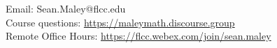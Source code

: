 \documentclass[11pt]{article} %
\begin{document}
\begin{center}
	{\small Email: Sean.Maley@flcc.edu\\
	Course questions: \textcolor{blue}{\url{https://maleymath.discourse.group}}\\
	Remote Office Hours: \textcolor{blue}{\url{https://flcc.webex.com/join/sean.maley}}}
	
\end{center}
\end{document}
